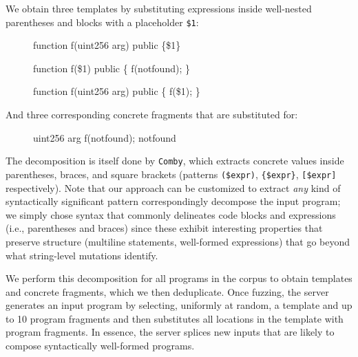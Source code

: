 We obtain three templates by substituting expressions inside well-nested parentheses and blocks with a placeholder \texttt{\$1}:


\begin{figure}[ht!]
\begin{code}
function f(uint256 arg) public \{\$1\} 
\end{code}
\end{figure}

\begin{figure}[ht!]
\begin{code}
function f(\$1) public \{
    f(notfound);
\} 
\end{code}
\end{figure}

\begin{figure}[ht!]
\begin{code}
function f(uint256 arg) public \{
    f(\$1);
\} 
\end{code}
\end{figure}

And three corresponding concrete fragments that are substituted for:

\begin{figure}[ht!]
\begin{code}
uint256 arg
f(notfound);
notfound
\end{code}
\end{figure}

The decomposition is itself done by \texttt{Comby}, which extracts concrete
values inside parentheses, braces, and square brackets (patterns
\texttt{(\$expr)}, \texttt{\{\$expr\}}, \texttt{[\$expr]} respectively). Note
that our approach can be customized to extract \emph{any} kind of syntactically
significant pattern correspondingly decompose the input program; we simply
chose syntax that commonly delineates code blocks and expressions (i.e.,
parentheses and braces) since these exhibit interesting properties that
preserve structure (multiline statements, well-formed expressions) that go
beyond what string-level mutations identify.


We perform this decomposition for all programs in the corpus to obtain
templates and concrete fragments, which we then deduplicate. Once fuzzing, the
server generates an input program by selecting, uniformly at random, a template
and up to 10 program fragments and then substitutes all locations in the
template with program fragments. In essence, the server splices new inputs that
are likely to compose syntactically well-formed programs.

